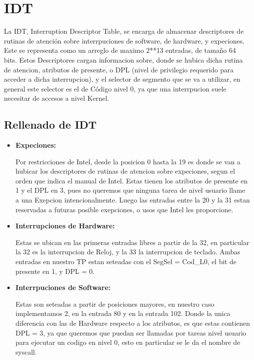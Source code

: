 \section{IDT}
\label{subsec:IDT}
\par{La IDT, Interruption Descriptor Table, se encarga de almacenar descriptores de rutinas de atención sobre interrpuciones de software, de hardware, y expeciones. Este se representa como un arreglo de maximo 2**13 entradas, de tamaño 64 bits. Estos Descriptores cargan informacion sobre, donde se hubica dicha rutina de atencion, atributos de presente, o DPL (nivel de privilegio requerido para acceder a dicha interrupcion), y el selector de segmento que se va a utilizar, en general este selector es el de Código nivel 0, ya que una interrpucion suele necesitar de accesos a nivel Kernel.}

\subsection{Rellenado de IDT}
\begin{itemize}
	\item {\bfseries Expeciones: }
	\par{Por restricciones de Intel, desde la posicion 0 hasta la 19 es donde se van a hubicar los descriptores de rutinas de atencion sobre expeciones, segun el orden que indica el manual de Intel. Estas tienen los atributos de presente en 1 y el DPL en 3, pues no queremos que ninguna tarea de nivel usuario llame a una Exepcion intencionalmente. Luego las entradas entre la 20 y la 31 estan reservadas a futuras posible exepciones, o usos que Intel les proporcione.}
	
	\item {\bfseries Interrupciones de Hardware: }
	\par{ Estas se ubican en las primeras entradas libres a partir de la 32, en particular la 32 es la interrupcion de Reloj, y la 33 la interrupcion de teclado. Ambas entradas en nuestro TP estan seteadas con el SegSel = Cod\_L0, el bit de presente en 1, y DPL = 0.}
	
	\item {\bfseries Interrpuciones de Software: }
	\par{Estas son seteadas a partir de posiciones mayores, en nuestro caso implementamos 2, en la entrada 80 y en la entrada 102. Donde la unica diferencia con las de Hardware respecto a los atributos, es que estas contienen DPL = 3, ya que queremos que puedan ser llamadas por tareas nivel usuario para ejecutar un codigo en nivel 0, esto en particular se le da el nombre de syscall.}

\end{itemize}

